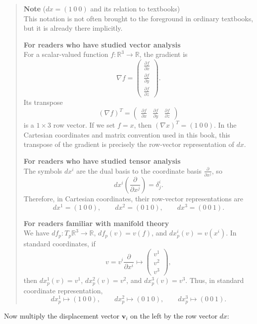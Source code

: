 \begin{quote}
\textbf{Note} (\(dx=(1\ 0\ 0)\) and its relation to textbooks)\\
This notation is not often brought to the foreground in ordinary
textbooks, but it is already there implicitly.

\textbf{For readers who have studied vector analysis}\\
For a scalar-valued function \(f:\mathbb{R}^3\to\mathbb{R}\), the
gradient is \[
\nabla f = \begin{pmatrix}
\frac{\partial f}{\partial x} \\
\frac{\partial f}{\partial y} \\
\frac{\partial f}{\partial z}
\end{pmatrix}.
\] Its transpose \[
(\nabla f)^T=
\begin{pmatrix}
\frac{\partial f}{\partial x} &
\frac{\partial f}{\partial y} &
\frac{\partial f}{\partial z}
\end{pmatrix}
\] is a \(1\times3\) row vector. If we set \(f=x\), then
\((\nabla x)^T=(1\ 0\ 0)\). In the Cartesian coordinates and matrix
convention used in this book, this transpose of the gradient is
precisely the row-vector representation of \(dx\).

\textbf{For readers who have studied tensor analysis}\\
The symbols \(dx^i\) are the dual basis to the coordinate basis
\(\frac{\partial}{\partial x^j}\), so \[
dx^i\!\left(\frac{\partial}{\partial x^j}\right)=\delta^i_j.
\] Therefore, in Cartesian coordinates, their row-vector representations
are \[
dx^1=(1\ 0\ 0),\qquad dx^2=(0\ 1\ 0),\qquad dx^3=(0\ 0\ 1).
\]

\textbf{For readers familiar with manifold theory}\\
We have \(df_p:T_p\mathbb{R}^3\to\mathbb{R}\), \(df_p(v)=v(f)\), and
\(dx^i_p(v)=v(x^i)\). In standard coordinates, if \[
v=v^i\frac{\partial}{\partial x^i}
\longmapsto
\begin{pmatrix}v^1\\v^2\\v^3\end{pmatrix},
\] then \(dx^1_p(v)=v^1\), \(dx^2_p(v)=v^2\), and \(dx^3_p(v)=v^3\).
Thus, in standard coordinate representation, \[
dx^1_p\longmapsto(1\ 0\ 0),\qquad
dx^2_p\longmapsto(0\ 1\ 0),\qquad
dx^3_p\longmapsto(0\ 0\ 1).
\]
\end{quote}

Now multiply the displacement vector \(\mathbf{v}_i\) on the left by the
row vector \(dx\):

